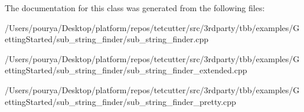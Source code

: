 The documentation for this class was generated from the following files\+:\begin{DoxyCompactItemize}
\item 
/\+Users/pourya/\+Desktop/platform/repos/tetcutter/src/3rdparty/tbb/examples/\+Getting\+Started/sub\+\_\+string\+\_\+finder/sub\+\_\+string\+\_\+finder.\+cpp\item 
/\+Users/pourya/\+Desktop/platform/repos/tetcutter/src/3rdparty/tbb/examples/\+Getting\+Started/sub\+\_\+string\+\_\+finder/sub\+\_\+string\+\_\+finder\+\_\+extended.\+cpp\item 
/\+Users/pourya/\+Desktop/platform/repos/tetcutter/src/3rdparty/tbb/examples/\+Getting\+Started/sub\+\_\+string\+\_\+finder/sub\+\_\+string\+\_\+finder\+\_\+pretty.\+cpp\end{DoxyCompactItemize}
